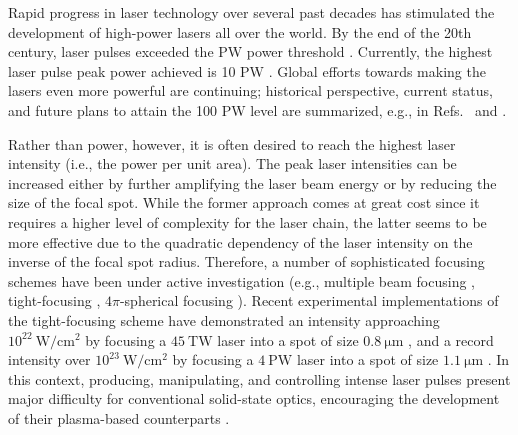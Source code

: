 \documentclass[10pt, a4paper, twoside, openright]{report}
\begin{document}

Rapid progress in laser technology over several past decades has stimulated the development of high-power lasers all over the world. By the end of the 20th century, laser pulses exceeded the PW power threshold \cite{Perry1999}. Currently, the highest laser pulse peak power achieved is 10 PW \cite{Tanaka2020}. Global efforts towards making the lasers even more powerful are continuing; historical perspective, current status, and future plans to attain the 100 PW level are summarized, e.g., in Refs.~ and .

Rather than power, however, it is often desired to reach the highest laser intensity (i.e., the power per unit area). The peak laser intensities can be increased either by further amplifying the laser beam energy or by reducing the size of the focal spot. While the former approach comes at great cost since it requires a higher level of complexity for the laser chain, the latter seems to be more effective due to the quadratic dependency of the laser intensity on the inverse of the focal spot radius. Therefore, a number of sophisticated focusing schemes have been under active investigation (e.g., multiple beam focusing \cite{Bulanov2010}, tight-focusing \cite{Bahk2004, Jeong2015}, $ 4 \pi $-spherical focusing \cite{Gonoskov2012, Jeong2020}). Recent experimental implementations of the tight-focusing scheme have demonstrated an intensity approaching $ 10^{22} \ \mathrm{W / cm^{2}} $ by focusing a $ 45 \ \mathrm{TW} $ laser into a spot of size $ 0.8 \ \mathrm{\mu m} $ \cite{Bahk2004}, and a record intensity over $ 10^{23} \ \mathrm{W / cm^{2}} $ by focusing a $ 4 \ \mathrm{PW} $ laser into a spot of size $ 1.1 \ \mathrm{\mu m} $ \cite{Yoon2021}. In this context, producing, manipulating, and controlling intense laser pulses present major difficulty for conventional solid-state optics, encouraging the development of their plasma-based counterparts \cite{Thaury2007, Nakatsutsumi2010, Tamburini2014, Peng2019}.
\end{document}
